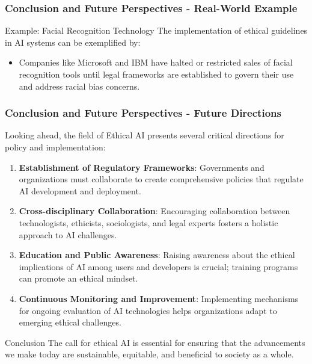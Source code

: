 \documentclass{beamer}
\begin{document}
\begin{frame}[fragile]
    \frametitle{Conclusion and Future Perspectives - Real-World Example}
    \begin{block}{Example: Facial Recognition Technology}
        The implementation of ethical guidelines in AI systems can be exemplified by:
        \begin{itemize}
            \item Companies like Microsoft and IBM have halted or restricted sales of facial recognition tools until legal frameworks are established to govern their use and address racial bias concerns.
        \end{itemize}
    \end{block}
\end{frame}

\begin{frame}[fragile]
    \frametitle{Conclusion and Future Perspectives - Future Directions}
    Looking ahead, the field of Ethical AI presents several critical directions for policy and implementation:

    \begin{enumerate}
        \item \textbf{Establishment of Regulatory Frameworks}:
            Governments and organizations must collaborate to create comprehensive policies that regulate AI development and deployment.
        \item \textbf{Cross-disciplinary Collaboration}:
            Encouraging collaboration between technologists, ethicists, sociologists, and legal experts fosters a holistic approach to AI challenges.
        \item \textbf{Education and Public Awareness}:
            Raising awareness about the ethical implications of AI among users and developers is crucial; training programs can promote an ethical mindset.
        \item \textbf{Continuous Monitoring and Improvement}:
            Implementing mechanisms for ongoing evaluation of AI technologies helps organizations adapt to emerging ethical challenges.
    \end{enumerate}

    \begin{block}{Conclusion}
        The call for ethical AI is essential for ensuring that the advancements we make today are sustainable, equitable, and beneficial to society as a whole.
    \end{block}
\end{frame}
\end{document}
